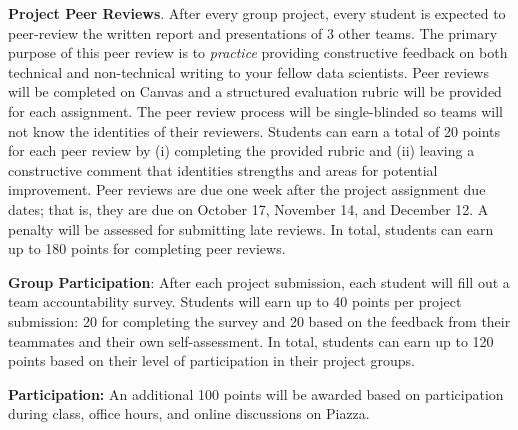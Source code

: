\documentclass[11pt]{article}
\begin{document}
\textbf{Project Peer Reviews}. After every group project, every student is expected to peer-review the written report and presentations of 3 other teams. 
The primary purpose of this peer review is to \emph{practice} providing constructive feedback on both technical and non-technical writing to your fellow data scientists.
Peer reviews will be completed on Canvas and a structured evaluation rubric will be provided for each assignment. 
The peer review process will be single-blinded so teams will not know the identities of their reviewers.
Students can earn a total of 20 points for each peer review by (i) completing the provided rubric and (ii) leaving a constructive comment that identities strengths and areas for potential improvement.
Peer reviews are due one week after the project assignment due dates; that is, they are due on October 17, November 14, and December 12.
A penalty will be assessed for submitting late reviews.
In total, students can earn up to 180 points for completing peer reviews. 

\textbf{Group Participation}: After each project submission, each student will fill out a team accountability survey.
Students will earn up to 40 points per project submission: 20 for completing the survey and 20 based on the feedback from their teammates and their own self-assessment. 
In total, students can earn up to 120 points based on their level of participation in their project groups.

\textbf{Participation:} An additional 100 points will be awarded based on participation during class, office hours, and online discussions on Piazza.
\end{document}
